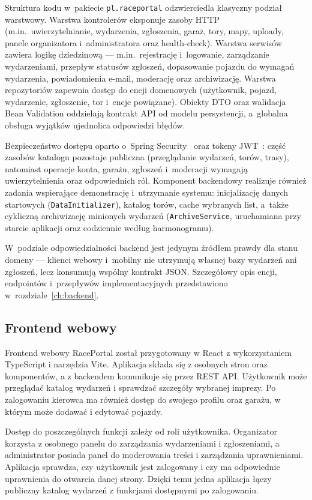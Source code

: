 \documentclass{sprz}
\begin{document}
Struktura kodu w~pakiecie \texttt{pl.raceportal} odzwierciedla klasyczny podział warstwowy. Warstwa kontrolerów eksponuje zasoby HTTP (m.in.\ uwierzytelnianie, wydarzenia, zgłoszenia, garaż, tory, mapy, uploady, panele organizatora i~administratora oraz health-check). Warstwa serwisów zawiera logikę dziedzinową --- m.in.\ rejestrację i~logowanie, zarządzanie wydarzeniami, przepływ statusów zgłoszeń, dopasowanie pojazdu do wymagań wydarzenia, powiadomienia e-mail, moderację oraz archiwizację. Warstwa repozytoriów zapewnia dostęp do encji domenowych (użytkownik, pojazd, wydarzenie, zgłoszenie, tor i~encje powiązane). Obiekty DTO oraz walidacja Bean Validation oddzielają kontrakt API od modelu persystencji, a~globalna obsługa wyjątków ujednolica odpowiedzi błędów.

Bezpieczeństwo dostępu oparto o~Spring Security~\cite{spring:security} oraz tokeny JWT~\cite{jwt:rfc}: część zasobów katalogu pozostaje publiczna (przeglądanie wydarzeń, torów, trasy), natomiast operacje konta, garażu, zgłoszeń i~moderacji wymagają uwierzytelnienia oraz odpowiednich ról. Komponent backendowy realizuje również zadania wspierające demonstrację i~utrzymanie systemu: inicjalizację danych startowych (\texttt{DataInitializer}), katalog torów, cache wybranych list, a~także cykliczną archiwizację minionych wydarzeń (\texttt{ArchiveService}, uruchamiana przy starcie aplikacji oraz codziennie według harmonogramu).

W~podziale odpowiedzialności backend jest jedynym źródłem prawdy dla stanu domeny --- klienci webowy i~mobilny nie utrzymują własnej bazy wydarzeń ani zgłoszeń, lecz konsumują wspólny kontrakt JSON. Szczegółowy opis encji, endpointów i~przepływów implementacyjnych przedstawiono w~rozdziale~\ref{ch:backend}.

\subsection{Frontend webowy}
\label{sec:realizacja-frontend}
Frontend webowy RacePortal został przygotowany w React z wykorzystaniem
TypeScript i narzędzia Vite.
Aplikacja składa się z osobnych stron oraz komponentów, a z backendem
komunikuje się przez REST API.
Użytkownik może przeglądać katalog wydarzeń i sprawdzać szczegóły
wybranej imprezy.
Po zalogowaniu kierowca ma również dostęp do swojego profilu
oraz garażu, w którym może dodawać i edytować pojazdy.

Dostęp do poszczególnych funkcji zależy od roli użytkownika.
Organizator korzysta z osobnego panelu do zarządzania wydarzeniami
i zgłoszeniami, a administrator posiada panel do moderowania treści
i zarządzania uprawnieniami.
Aplikacja sprawdza, czy użytkownik jest zalogowany i czy ma odpowiednie
uprawnienia do otwarcia danej strony.
Dzięki temu jedna aplikacja łączy publiczny katalog wydarzeń
z funkcjami dostępnymi po zalogowaniu.
\end{document}
